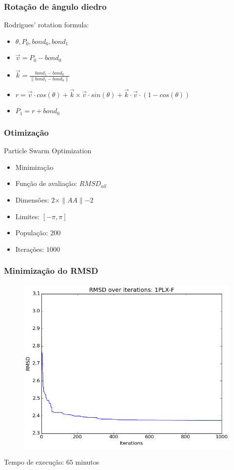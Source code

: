 \documentclass{beamer}
\begin{document}
\begin{frame}
\frametitle{Rotação de ângulo diedro}

Rodrigues' rotation formula:

\begin{itemize}
 \item $\theta, P_{0}, bond_{0}, bond_{1}$
 \item $\vec{v} = P_{0} - bond_{0}$
 \item $\vec{k} = \frac{bond_{1} - bond_{0}}{\parallel bond_{1} - bond_{0} \parallel}$
 \item $r = \vec{v}  \cdot cos(\theta) + \vec{k} \times \vec{v} \cdot sin(\theta) + \vec{k} \cdot \vec{v} \cdot (1 - cos(\theta))$
 \item $P_{1} = r +  bond_{0}$
\end{itemize}
\end{frame}

\begin{frame}
\frametitle{Otimização}
Particle Swarm Optimization
\begin{itemize}
  \item Minimização
  \item Função de avaliação: $RMSD_{all}$
  \item Dimensões: $2 \times \parallel AA \parallel - 2$
  \item Limites: $[-\pi, \pi]$
  \item População: $200$
  \item Iterações: $1000$

\end{itemize}
\end{frame}

\begin{frame}
\frametitle{Minimização do RMSD}
\begin{figure}
\includegraphics[width=0.7\linewidth]{1PLX-F_rmsd.png}
\end{figure}
Tempo de execução: $65$ minutos
\end{frame}
\end{document}
